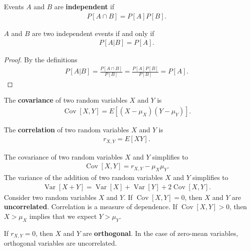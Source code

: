 \documentclass{memoir}
\newcommand{\Cov}{\operatorname{Cov}}
\newcommand{\Var}{\operatorname{Var}}
\begin{document}
\begin{definition}
    Events $A$ and $B$ are \textbf{independent} if
    \begin{align*}
        P[A \cap B]=P[A] P[B].
    \end{align*}
\end{definition}

\begin{theorem}
    $A$ and $B$ are two independent events if and only if
    \begin{align*}
        P[A | B] = P[A].
    \end{align*}
\end{theorem}
\begin{proof}
    By the definitions
    \begin{align*}
        P[A | B] = \frac{P[A \cap B]}{P[B]} = \frac{P[A]P[B]}{P[B]} = P[A].
    \end{align*}
\end{proof}

\begin{definition}
    The \textbf{covariance} of two random variables $X$ and $Y$ is
    \begin{align*}
        \Cov[X,Y]=E[(X- \mu_X)(Y- \mu_Y)].
    \end{align*}
\end{definition}

\begin{definition}
    The \textbf{correlation} of two random variables $X$ and $Y$ is
    \begin{align*}
        r_{X,Y} = E[XY].
    \end{align*}
\end{definition}
The covariance of two random variables $X$ and $Y$ simplifies to
\begin{align*}
    \Cov[X,Y] = r_{X,Y} - \mu_X \mu_Y.
\end{align*}
The variance of the addition of two random variables $X$ and $Y$ simplifies to
\begin{align*}
    \Var[X+Y] = \Var[X] + \Var[Y] + 2 \Cov[X,Y].
\end{align*}
Consider two random variables $X$ and $Y$. If $\Cov[X,Y]=0$, then $X$ and $Y$ are \textbf{uncorrelated}. Correlation is a measure of dependence. If $\Cov[X,Y]>0$, then $X>\mu_X$ implies that we expect $Y>\mu_Y$.

If $r_{X,Y}=0$, then $X$ and $Y$ are \textbf{orthogonal}. In the case of zero-mean variables, orthogonal variables are uncorrelated.
\end{document}
